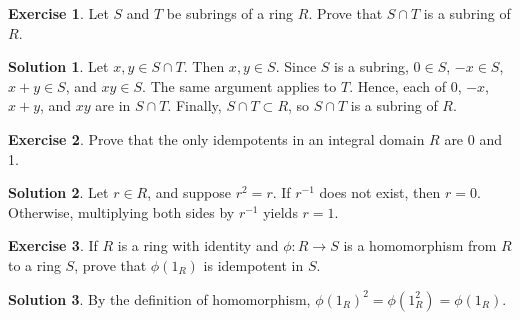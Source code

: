 \documentclass{article}
\theoremstyle{definition}
\newtheorem{exercise}{Exercise}
\newtheorem*{solution}{Solution}
\begin{document}
\begin{exercise}
    Let \(S\) and \(T\) be subrings of a ring \(R\). Prove that \(S\cap T\) is a subring of \(R\).
\end{exercise}
\begin{solution}
        Let \(x,y\in S\cap T\). Then \(x,y\in S\). Since \(S\) is a subring, \(0\in S\), \(-x\in S\), \(x+y\in S\), and \(xy\in S\). The same argument applies to \(T\). Hence, each of 0, \(-x\), \(x+y\), and \(xy\) are in \(S\cap T\). Finally, \(S\cap T\subset R\), so \(S\cap T\) is a subring of \(R\).
\end{solution}

\begin{exercise}
    Prove that the only idempotents in an integral domain \(R\) are 0 and 1.
\end{exercise}
\begin{solution}
    Let \(r\in R\), and suppose \(r^2=r\). If \(r^{-1}\) does not exist, then \(r=0\). Otherwise, multiplying both sides by \(r^{-1}\) yields \(r=1\). 
\end{solution}

\begin{exercise}
    If \(R\) is a ring with identity and \(\phi:R\to S\) is a homomorphism from \(R\) to a ring \(S\), prove that \(\phi(1_R)\) is idempotent in \(S\).
\end{exercise}
\begin{solution}
    By the definition of homomorphism, \(\phi(1_R)^2=\phi(1_R^2)=\phi(1_R)\).
\end{solution}
\end{document}
